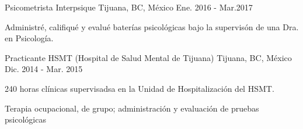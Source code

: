 \begin{cventries}
    \cventry
        {Psicometrista}
        {Interpsique}
        {Tijuana, BC, México}
        {Ene. 2016 - Mar.2017}
        {
            \begin{cvitems}
                \item {Administré, califiqué y evalué baterías psicológicas bajo la supervisón de una Dra. en Psicología.}
            \end{cvitems}
        }
    \cventry
        {Practicante}
        {HSMT (Hospital de Salud Mental de Tijuana)}
        {Tijuana, BC, México}
        {Dic. 2014 - Mar. 2015}
        {
            \begin{cvitems}
                \item {240 horas clínicas supervisadsa en la Unidad de Hospitalización del HSMT.}
                \item {Terapia ocupacional, de grupo; administración y evaluación de pruebas psicológicas}
            \end{cvitems}
        }
\end{cventries}
